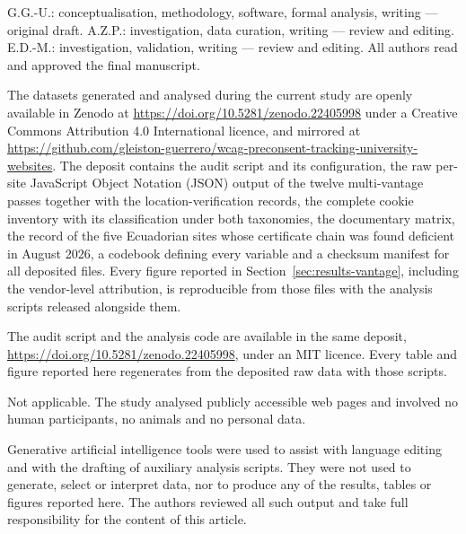 \documentclass[pdflatex,sn-basic,Numbered,iicol]{sn-jnl}
\theoremstyle{thmstyleone}
\theoremstyle{thmstyletwo}
\theoremstyle{thmstylethree}
\begin{document}
	G.G.-U.: conceptualisation, methodology, software, formal analysis, writing --- original draft. A.Z.P.: investigation, data curation, writing --- review and editing. E.D.-M.: investigation, validation, writing --- review and editing. All authors read and approved the final manuscript.
	
	The datasets generated and analysed during the current study are openly available in Zenodo at \url{https://doi.org/10.5281/zenodo.22405998} under a Creative Commons Attribution 4.0 International licence, and mirrored at \url{https://github.com/gleiston-guerrero/wcag-preconsent-tracking-university-websites}. The deposit contains the audit script and its configuration, the raw per-site JavaScript Object Notation (JSON) output of the twelve multi-vantage passes together with the location-verification records, the complete cookie inventory with its classification under both taxonomies, the documentary matrix, the record of the five Ecuadorian sites whose certificate chain was found deficient in August 2026, a codebook defining every variable and a checksum manifest for all deposited files. Every figure reported in Section~\ref{sec:results-vantage}, including the vendor-level attribution, is reproducible from those files with the analysis scripts released alongside them.
	
	The audit script and the analysis code are available in the same deposit, \url{https://doi.org/10.5281/zenodo.22405998}, under an MIT licence. Every table and figure reported here regenerates from the deposited raw data with those scripts.
	
	Not applicable. The study analysed publicly accessible web pages and involved no human participants, no animals and no personal data.
	
	Generative artificial intelligence tools were used to assist with language editing and with the drafting of auxiliary analysis scripts. They were not used to generate, select or interpret data, nor to produce any of the results, tables or figures reported here. The authors reviewed all such output and take full responsibility for the content of this article.
	
\end{document}
